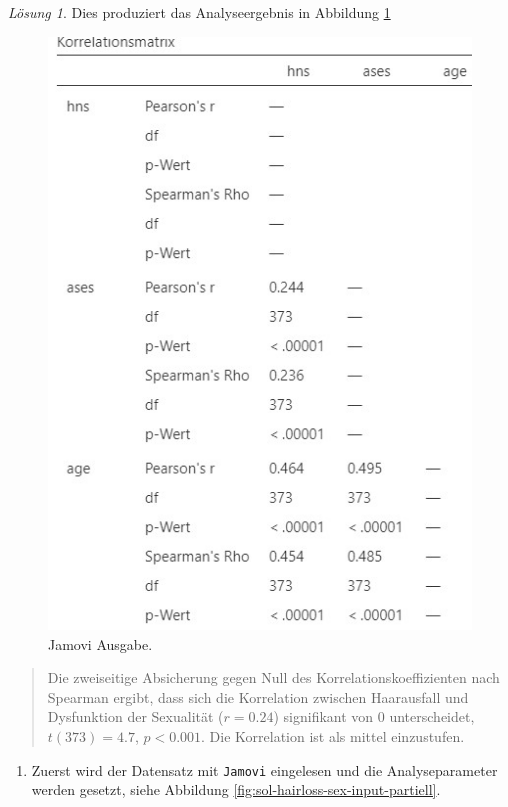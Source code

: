 \documentclass[
]{book}
\providecommand{\tightlist}{%
  \setlength{\itemsep}{0pt}\setlength{\parskip}{0pt}}
\theoremstyle{definition}
\theoremstyle{definition}
\theoremstyle{definition}
\theoremstyle{definition}
\theoremstyle{remark}
\newtheorem*{solution}{Lösung}
\begin{document}
\begin{solution}
Dies produziert das Analyseergebnis in Abbildung \ref{fig:sol-hairloss-sex-output-spearman}

\begin{figure}
\includegraphics[width=0.5\linewidth]{figures/08-exr-hairloss-sex-jmv-output-spearman} \caption{Jamovi Ausgabe.}\label{fig:sol-hairloss-sex-output-spearman}
\end{figure}

\begin{quote}
Die zweiseitige Absicherung gegen Null des Korrelationskoeffizienten nach Spearman ergibt, dass sich die Korrelation zwischen Haarausfall und Dysfunktion der Sexualität (\(r = 0.24\)) signifikant von \(0\) unterscheidet, \(t(373) = 4.7\), \(p < 0.001\). Die Korrelation ist als mittel einzustufen.
\end{quote}

\begin{enumerate}
\def\labelenumi{\alph{enumi})}
\setcounter{enumi}{2}
\tightlist
\item
  Zuerst wird der Datensatz mit \texttt{Jamovi} eingelesen und die Analyseparameter werden gesetzt, siehe Abbildung \ref{fig:sol-hairloss-sex-input-partiell}.
\end{enumerate}


\end{solution}
\end{document}
